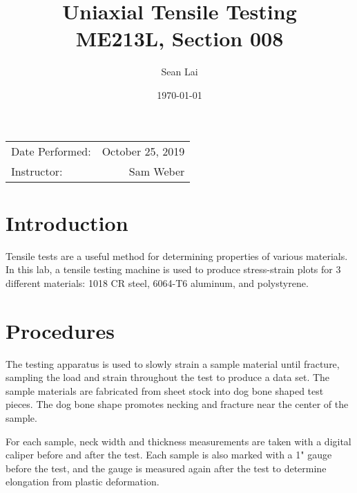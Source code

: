 \documentclass{article}
\title{Uniaxial Tensile Testing \\ ME213L, Section 008}
\author{Sean Lai} %
\date{\today} %
\begin{document}
\maketitle %

\begin{center}
\begin{tabular}{l r}
Date Performed: & October 25, 2019 \\ %

Instructor: & Sam Weber %
\end{tabular}
\end{center}



\section{Introduction}

Tensile tests are a useful method for determining properties of various materials. In this lab, a tensile testing machine is used to produce stress-strain plots for 3 different materials: 1018 CR steel, 6064-T6 aluminum, and polystyrene.



\section{Procedures}

The testing apparatus is used to slowly strain a sample material until fracture, sampling the load and strain throughout the test to produce a data set. The sample materials are fabricated from sheet stock into dog bone shaped test pieces. The dog bone shape promotes necking and fracture near the center of the sample.
\vspace{1em}

For each sample, neck width and thickness measurements are taken with a digital caliper before and after the test. Each sample is also marked with a 1" gauge before the test, and the gauge is measured again after the test to determine elongation from plastic deformation.
\end{document}
